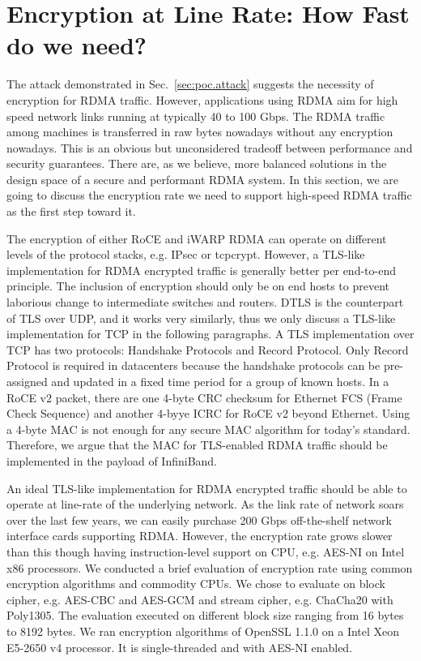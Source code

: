 \section{Encryption at Line Rate: How Fast do we need?}
\label{sec:encrypt}

The attack demonstrated in Sec.~\ref{sec:poc.attack} suggests the necessity of encryption for RDMA traffic.
However, applications using RDMA aim for high speed network links running at typically 40 to 100 Gbps.
The RDMA traffic among machines is transferred in raw bytes nowadays without any encryption nowadays.
This is an obvious but unconsidered tradeoff between performance and security guarantees.
There are, as we believe, more balanced solutions in the design space of a secure and performant RDMA system.
In this section, we are going to discuss the encryption rate we need to support high-speed RDMA traffic
as the first step toward it.

The encryption of either RoCE and iWARP RDMA can operate on different levels of the protocol stacks, e.g. IPsec or tcpcrypt. However, a TLS-like implementation for RDMA encrypted traffic is generally better per end-to-end principle.
The inclusion of encryption should only be on end hosts to prevent laborious change to intermediate switches and routers.
DTLS is the counterpart of TLS over UDP, and it works very similarly, thus we only discuss a TLS-like implementation for TCP in the following paragraphs. A TLS implementation over TCP has two protocols: Handshake Protocols and Record Protocol. Only Record Protocol is required in datacenters because the handshake protocols can be pre-assigned and updated in a fixed time period for a group of known hosts. In a RoCE v2 packet, there are one 4-byte CRC checksum for Ethernet FCS (Frame Check Sequence) and another 4-byye ICRC for RoCE v2 beyond Ethernet. Using a 4-byte MAC is not enough for any secure MAC algorithm for today's standard. Therefore, we argue that the MAC for TLS-enabled RDMA traffic should be implemented in the payload of InfiniBand.

An ideal TLS-like implementation for RDMA encrypted traffic should be able to operate at line-rate of the underlying network. As the link rate of network soars over the last few years, we can easily purchase 200 Gbps off-the-shelf network interface cards supporting RDMA. However, the encryption rate grows slower than this though having instruction-level support on CPU, e.g. AES-NI on Intel x86 processors. We conducted a brief evaluation of encryption rate using common encryption algorithms and commodity CPUs. We chose to evaluate on block cipher, e.g. AES-CBC and AES-GCM and stream cipher, e.g. ChaCha20 with Poly1305. The evaluation executed on different block size ranging from 16 bytes to 8192 bytes. We ran encryption algorithms of OpenSSL 1.1.0 on a Intel Xeon E5-2650 v4 processor. It is single-threaded and with AES-NI enabled.

